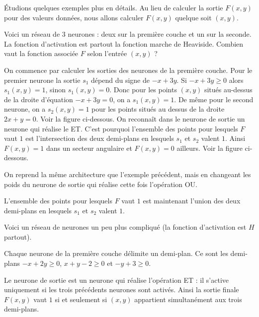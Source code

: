\documentclass[11pt,class=report,crop=false]{standalone}
\begin{document}
\'Etudions quelques exemples plus en détails. Au lieu de calculer la sortie $F(x,y)$ pour des valeurs données, nous allons calculer $F(x,y)$ quelque soit $(x,y)$.

\begin{exemple}
Voici un réseau de $3$ neurones : deux sur la première couche et un sur la seconde. La fonction d'activation est partout la fonction marche de Heaviside.
Combien vaut la fonction associée $F$ selon l'entrée $(x,y)$ ?



On commence par calculer les sorties des neurones de la première couche.
Pour le premier neurone la sortie $s_1$ dépend du signe de $-x+3y$.
Si $-x+3y \ge 0$ alors $s_1(x,y)=1$, sinon $s_1(x,y)=0$. Donc pour les points $(x,y)$ situés au-dessus de la droite d'équation $-x+3y=0$, on a $s_1(x,y)=1$.
De même pour le second neurone, on a $s_2(x,y)=1$ pour les points situés au dessus de la droite $2x+y=0$. Voir la figure ci-dessous.
On reconnaît dans le neurone de sortie un neurone qui réalise le \og{}ET\fg{}. 
C'est pourquoi l'ensemble des points pour lesquels $F$ vaut $1$ est l'intersection des deux demi-plans en lesquels $s_1$ et $s_2$ valent $1$. Ainsi $F(x,y)=1$ dans un secteur angulaire et $F(x,y)=0$ ailleurs. Voir la figure ci-dessous.


\end{exemple}

\begin{exemple}
On reprend la même architecture que l'exemple précédent, mais en changeant les poids du neurone de sortie qui réalise cette fois l'opération \og{}OU\fg{}.


L'ensemble des points pour lesquels $F$ vaut $1$ est maintenant l'union des deux demi-plans en lesquels $s_1$ et $s_2$ valent $1$.

\end{exemple}

\begin{exemple}
Voici un réseau de neurones un peu plus compliqué (la fonction d'activation est $H$ partout). 

Chaque neurone de la première couche délimite un demi-plan. Ce sont les demi-plans $-x+2y\ge0$, $x+y-2\ge0$ et $-y+3\ge0$.

Le neurone de sortie est un neurone qui réalise l'opération \og{}ET\fg{} : il s'active uniquement si les trois précédents neurones sont activés.
Ainsi la sortie finale $F(x,y)$ vaut $1$ si et seulement si $(x,y)$ appartient simultanément aux trois demi-plans.


\end{exemple}
\end{document}
